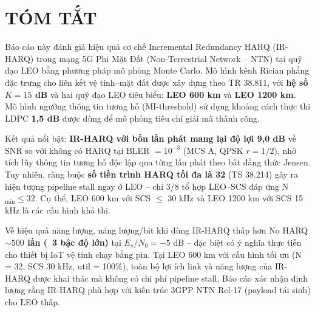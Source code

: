 \section*{TÓM TẮT}

Báo cáo này đánh giá hiệu quả cơ chế Incremental Redundancy HARQ (IR-HARQ) trong mạng 5G Phi Mặt Đất (Non-Terrestrial Network -- NTN) tại quỹ đạo LEO bằng phương pháp mô phỏng Monte Carlo. Mô hình kênh Rician phẳng đặc trưng cho liên kết vệ tinh--mặt đất được xây dựng theo TR 38.811, với \textbf{hệ số $K = 15$ dB} và hai quỹ đạo LEO tiêu biểu: \textbf{LEO 600 km} và \textbf{LEO 1200 km}. Mô hình ngưỡng thông tin tương hỗ (MI-threshold) sử dụng khoảng cách thực thi LDPC \textbf{1{,}5 dB} được dùng để mô phỏng tiêu chí giải mã thành công.

Kết quả nổi bật: \textbf{IR-HARQ với bốn lần phát mang lại độ lợi 9{,}0 dB} về SNR so với không có HARQ tại BLER $= 10^{-3}$ (MCS A, QPSK $r = 1/2$), nhờ tích lũy thông tin tương hỗ độc lập qua từng lần phát theo bất đẳng thức Jensen. Tuy nhiên, ràng buộc \textbf{số tiến trình HARQ tối đa là 32} (TS 38.214) gây ra hiện tượng pipeline stall ngay ở LEO -- chỉ 3/8 tổ hợp LEO--SCS đáp ứng N$_{\min} \leq 32$. Cụ thể, LEO 600 km với SCS $\leq$ 30 kHz và LEO 1200 km với SCS 15 kHz là các cấu hình khả thi.

Về hiệu quả năng lượng, năng lượng/bit khi dùng IR-HARQ thấp hơn No HARQ \textbf{$\sim 500$ lần (~3 bậc độ lớn)} tại $E_s/N_0 = -5$ dB -- đặc biệt có ý nghĩa thực tiễn cho thiết bị IoT vệ tinh chạy bằng pin. Tại LEO 600 km với cấu hình tối ưu (N = 32, SCS 30 kHz, util = 100\%), toàn bộ lợi ích link và năng lượng của IR-HARQ được khai thác mà không có chi phí pipeline stall. Báo cáo xác nhận định lượng rằng IR-HARQ phù hợp với kiến trúc 3GPP NTN Rel-17 (payload tái sinh) cho LEO thấp.

\cleardoublepage
